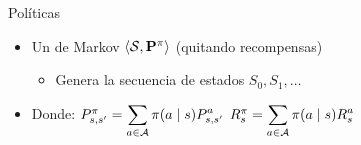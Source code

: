 \documentclass[10pt, envcountsect, handout, aspectratio=1610, hyperref={hypertexnames=true}]{beamer}
\begin{document}
\begin{frame}{Políticas}
\begin{itemize}
\begin{itemize}
			
        \item Un  de Markov $\langle \mathcal{S}, \mathbf{P}^\pi \rangle$ (quitando recompensas)
        	\begin{itemize}
			\item Genera la secuencia de estados $S_0, S_1, \ldots$ 
			\end{itemize}

        \item Donde: 
        \( P^\pi_{s, s'} = \displaystyle \sum_{a \in \mathcal{A}} \pi(a \mid s) P^a_{s, s'} \)
        \qquad
        \( R^\pi_s = \displaystyle \sum_{a \in \mathcal{A}} \pi(a \mid s) R^a_s \)
    
    
    \end{itemize}

    

\end{itemize}

\end{frame}
\end{document}
